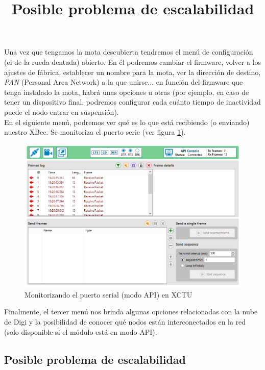 Una vez que tengamos la mota descubierta tendremos el menú de configuración (el de la rueda dentada) abierto. En él podremos
cambiar el firmware, volver a los ajustes de fábrica, establecer un nombre para la mota, ver la dirección de destino,
\textit{PAN} (Personal Area Network) a la que unirse... en función del firmware que tenga instalado la mota, habrá unas opciones u otras
(por ejemplo, en caso de tener un dispositivo final, podremos configurar cada cuánto tiempo de inactividad puede el nodo
entrar en suspensión).\\

En el siguiente menú, podremos ver qué es lo que está recibiendo (o enviando) nuestro XBee.
Se monitoriza el puerto serie (ver figura \ref{fig:interfaz2}).\\

\begin{figure}[!htb]
\centering
\includegraphics[width=1\textwidth]{./imagenes/interfaz2}
\caption{Monitorizando el puerto serial (modo API) en XCTU} \label{fig:interfaz2}
\end{figure}

Finalmente, el tercer menú nos brinda algunas opciones relacionadas con la nube de Digi y la posibilidad
de conocer qué nodos están interconectados en la red (solo disponible si el módulo está en modo API).\\

\subsection{Posible problema de escalabilidad}
\title{Posible problema de escalabilidad}
\label{subsec:problemaescalabilidad}

